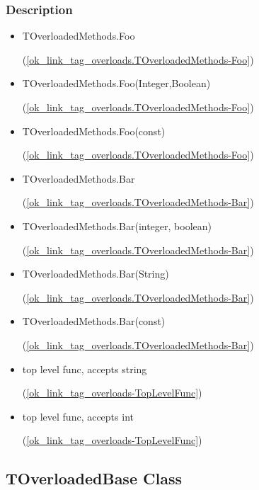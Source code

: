 \documentclass{report}
\begin{document}
\subsubsection*{\large{\textbf{Description}}\normalsize\hspace{1ex}\hfill}
\begin{itemize}
\item \begin{ttfamily}TOverloadedMethods.Foo\end{ttfamily}(\ref{ok_link_tag_overloads.TOverloadedMethods-Foo})
\item \begin{ttfamily}TOverloadedMethods.Foo(Integer,Boolean)\end{ttfamily}(\ref{ok_link_tag_overloads.TOverloadedMethods-Foo})
\item \begin{ttfamily}TOverloadedMethods.Foo(const)\end{ttfamily}(\ref{ok_link_tag_overloads.TOverloadedMethods-Foo})
\item \begin{ttfamily}TOverloadedMethods.Bar\end{ttfamily}(\ref{ok_link_tag_overloads.TOverloadedMethods-Bar})
\item \begin{ttfamily}TOverloadedMethods.Bar(integer, boolean)\end{ttfamily}(\ref{ok_link_tag_overloads.TOverloadedMethods-Bar})
\item \begin{ttfamily}TOverloadedMethods.Bar(String)\end{ttfamily}(\ref{ok_link_tag_overloads.TOverloadedMethods-Bar})
\item \begin{ttfamily}TOverloadedMethods.Bar(const)\end{ttfamily}(\ref{ok_link_tag_overloads.TOverloadedMethods-Bar})
\item \begin{ttfamily}top level func, accepts string\end{ttfamily}(\ref{ok_link_tag_overloads-TopLevelFunc})
\item \begin{ttfamily}top level func, accepts int\end{ttfamily}(\ref{ok_link_tag_overloads-TopLevelFunc})
\end{itemize}\subsection*{TOverloadedBase Class}
\end{document}
